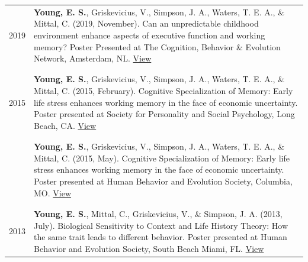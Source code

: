 \documentclass[
]{article}
\begin{document}
\begin{longtable}{p{2.25cm}p{5.5in}}
 2019 &\hangindent=0.25cm \textbf{Young, E. S.}, Griskevicius, V., Simpson, J. A., Waters, T. E. A., \& Mittal, C. (2019, November). Can an unpredictable childhood environment enhance aspects of executive function and working memory? Poster Presented at The Cognition, Behavior \& Evolution Network, Amsterdam, NL. \newline \href{https://www.ethan-young.com/cv/conference/2019_CBEN_poster.pdf}{\textcolor{downloadcolor}{\faFilePdfO{} View}} \\ \\& \\[-1.5em]
 2015 &\hangindent=0.25cm \textbf{Young, E. S.}, Griskevicius, V., Simpson, J. A., Waters, T. E. A., \& Mittal, C. (2015, February). Cognitive Specialization of Memory: Early life stress enhances working memory in the face of economic uncertainty. Poster presented at Society for Personality and Social Psychology, Long Beach, CA. \newline \href{https://www.ethan-young.com/cv/conference/2015_SPSP_poster.pdf}{\textcolor{downloadcolor}{\faFilePdfO{} View}} \\ \\& \\[-1.5em]
  &\hangindent=0.25cm \textbf{Young, E. S.}, Griskevicius, V., Simpson, J. A., Waters, T. E. A., \& Mittal, C. (2015, May). Cognitive Specialization of Memory: Early life stress enhances working memory in the face of economic uncertainty. Poster presented at Human Behavior and Evolution Society, Columbia, MO. \newline \href{https://www.ethan-young.com/cv/conference/2015_HBES_poster.pdf}{\textcolor{downloadcolor}{\faFilePdfO{} View}} \\ \\& \\[-1.5em]
 2013 &\hangindent=0.25cm \textbf{Young, E. S.}, Mittal, C., Griskevicius, V., \& Simpson, J. A. (2013, July). Biological Sensitivity to Context and Life History Theory: How the same trait leads to different behavior. Poster presented at Human Behavior and Evolution Society, South Beach Miami, FL. \newline \href{https://www.ethan-young.com/cv/conference/2013_HBES_poster.pdf}{\textcolor{downloadcolor}{\faFilePdfO{} View}} \\ 
\end{longtable}

\vspace{1ex}
\end{document}
